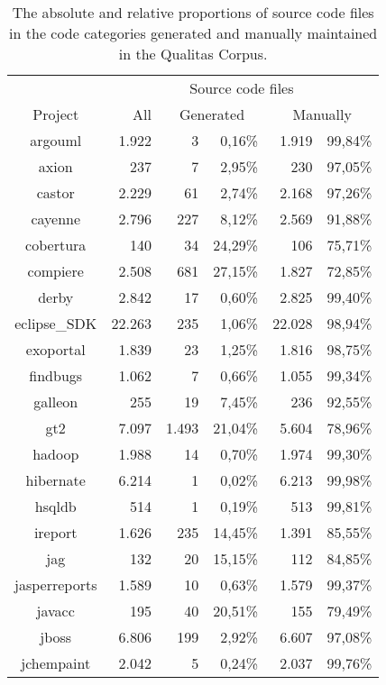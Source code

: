 \setlength{\extrarowheight}{-.17em}
\begin{table}
	\caption[Source code file distributions in the Qualitas Corpus.]{The absolute and relative proportions of source code files in the code categories generated and manually maintained in the Qualitas Corpus.}
	\label{table:countQualitasCorpus}
	\begin{tabularx}{\textwidth}{c|r|r|r|r|r}
		 & \multicolumn{5}{c}{Source code files}  \\
		Project & All & \multicolumn{2}{c|}{Generated} & \multicolumn{2}{c}{Manually}\\
		\hline
		argouml & 1.922 & 3 & 0,16\% & 1.919 & 99,84\% \\
		axion & 237 & 7 & 2,95\% & 230 & 97,05\% \\
		castor & 2.229 & 61 & 2,74\% & 2.168 & 97,26\% \\
		cayenne & 2.796 & 227 & 8,12\% & 2.569 & 91,88\% \\
		cobertura & 140 & 34 & 24,29\% & 106 & 75,71\% \\
		compiere & 2.508 & 681 & 27,15\% & 1.827 & 72,85\% \\
		derby & 2.842 & 17 & 0,60\% & 2.825 & 99,40\% \\
		eclipse\_SDK & 22.263 & 235 & 1,06\% & 22.028 & 98,94\% \\
		exoportal & 1.839 & 23 & 1,25\% & 1.816 & 98,75\% \\
		findbugs & 1.062 & 7 & 0,66\% & 1.055 & 99,34\% \\
		galleon & 255 & 19 & 7,45\% & 236 & 92,55\% \\
		gt2 & 7.097 & 1.493 & 21,04\% & 5.604 & 78,96\% \\
		hadoop & 1.988 & 14 & 0,70\% & 1.974 & 99,30\% \\
		hibernate & 6.214 & 1 & 0,02\% & 6.213 & 99,98\% \\
		hsqldb & 514 & 1 & 0,19\% & 513 & 99,81\% \\
		ireport & 1.626 & 235 & 14,45\% & 1.391 & 85,55\% \\
		jag & 132 & 20 & 15,15\% & 112 & 84,85\% \\
		jasperreports & 1.589 & 10 & 0,63\% & 1.579 & 99,37\% \\
		javacc & 195 & 40 & 20,51\% & 155 & 79,49\% \\
		jboss & 6.806 & 199 & 2,92\% & 6.607 & 97,08\% \\
		jchempaint & 2.042 & 5 & 0,24\% & 2.037 & 99,76\% \\

\end{tabularx}
\end{table}
